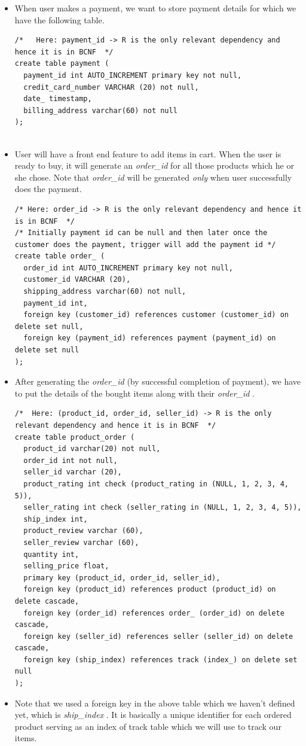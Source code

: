 \documentclass[a4paper,12pt]{article}
\newcommand{\ita}[1]{
    \textit{#1}
}
\begin{document}
\begin{itemize}
\begin{verbatim}
  \end{verbatim}
  \item When user makes a payment, we want to store payment details for which we have the following table.
  \begin{verbatim}
/*   Here: payment_id -> R is the only relevant dependency and hence it is in BCNF  */
create table payment (
  payment_id int AUTO_INCREMENT primary key not null,
  credit_card_number VARCHAR (20) not null,
  date_ timestamp,
  billing_address varchar(60) not null
);
    
  \end{verbatim}
  \item User will have a front end feature to add items in cart. When the user is ready to buy, it will generate an \ita{order\_id} for all those products which he or she chose. Note that \ita{order\_id} will be generated \ita{only} when user successfully does the payment.
  \begin{verbatim}
/* Here: order_id -> R is the only relevant dependency and hence it is in BCNF  */
/* Initially payment id can be null and then later once the customer does the payment, trigger will add the payment id */
create table order_ (
  order_id int AUTO_INCREMENT primary key not null,
  customer_id VARCHAR (20),
  shipping_address varchar(60) not null,
  payment_id int,
  foreign key (customer_id) references customer (customer_id) on delete set null,
  foreign key (payment_id) references payment (payment_id) on delete set null
);
  \end{verbatim}
  \item After generating the \ita{order\_id} (by successful completion of payment), we have to put the details of the bought items along with their \ita{order\_id}.
  \begin{verbatim}
/*  Here: (product_id, order_id, seller_id) -> R is the only relevant dependency and hence it is in BCNF  */
create table product_order (
  product_id varchar(20) not null,
  order_id int not null,
  seller_id varchar (20),
  product_rating int check (product_rating in (NULL, 1, 2, 3, 4, 5)),
  seller_rating int check (seller_rating in (NULL, 1, 2, 3, 4, 5)),
  ship_index int,
  product_review varchar (60),
  seller_review varchar (60),
  quantity int,
  selling_price float,
  primary key (product_id, order_id, seller_id),
  foreign key (product_id) references product (product_id) on delete cascade,
  foreign key (order_id) references order_ (order_id) on delete cascade,
  foreign key (seller_id) references seller (seller_id) on delete cascade,
  foreign key (ship_index) references track (index_) on delete set null
);
  \end{verbatim}
  \item Note that we used a foreign key in the above table which we haven't defined yet, which is \ita{ship\_index}. It is basically a unique identifier for each ordered product serving as an index of track table which we will use to track our items.
  \begin{verbatim}
    

\end{verbatim}
\end{itemize}
\end{document}
